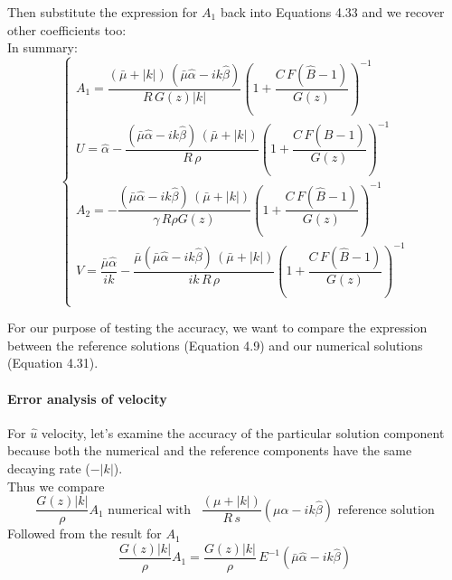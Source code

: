 Then substitute the expression for $A_1$ back into Equations 4.33 and we recover other coefficients too:\\
In summary:
\begin{equation}
\begin{cases}
A_1 = \dfrac{(\bar{\mu} + |k|)\,(\bar{\mu} \hat{\alpha} - ik \hat{\beta})}{R \, G(z) |k|}(1 + \dfrac{C \, F(\hat{B} - 1)}{G(z)})^{-1}\\
U = \hat{\alpha} - \dfrac{(\bar{\mu} \hat{\alpha} - ik \hat{\beta}) \, (\bar{\mu} + |k|)}{R \, \rho} (1 + \dfrac{C\,F(\hat{B} - 1)}{G(z)})^{-1}\\
A_2 = - \dfrac{(\bar{\mu} \hat{\alpha} - ik \hat{\beta}) \, (\bar{\mu} + |k|)}{\gamma \, R \rho G(z)}(1 + \dfrac{C\,F(\hat{B} - 1)}{G(z)})^{-1}\\
V = \dfrac{\bar{\mu} \hat{\alpha}}{i k} - \dfrac{\bar{\mu}(\bar{\mu} \hat{\alpha} - ik \hat{\beta}) \, (\bar{\mu} + |k|)}{ik \, R \, \rho} (1 + \dfrac{C\,F(\hat{B} - 1)}{G(z)})^{-1}\\
\end{cases}
\end{equation}

For our purpose of testing the accuracy, we want to compare the expression between the reference solutions (Equation 4.9) and our numerical solutions (Equation 4.31).\\

\paragraph*{Error analysis of velocity} 
For $\hat{u}$ velocity, let's examine the accuracy of the particular solution component because both the numerical and the reference components have the same decaying rate ($- |k|$).\\

Thus we compare
\begin{equation*}
\dfrac{G(z) |k|}{\rho} A_1 \text{ numerical with } \, \, \, \dfrac{(\mu + |k|)}{R \, s} (\mu \hat{\alpha} - ik \hat{\beta}) \text{ reference solution}
\end{equation*}
Followed from the result for $A_1$
\begin{equation*}
\dfrac{G(z) |k|}{\rho} A_1 = \dfrac{G(z) |k|}{\rho} \, E^{-1} (\bar{\mu} \hat{\alpha} - ik \hat{\beta})
\end{equation*}

